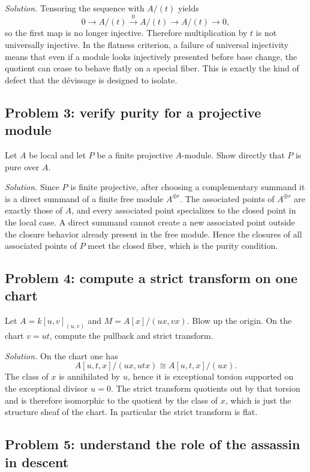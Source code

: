 \documentclass[11pt,oneside]{article}
\begin{document}
\emph{Solution.}  Tensoring the sequence with $A/(t)$ yields
\[
0\to A/(t)\xrightarrow{0}A/(t)\to A/(t)\to 0,
\]
so the first map is no longer injective.  Therefore multiplication by $t$ is not universally injective.  In the flatness criterion, a failure of universal injectivity means that even if a module looks injectively presented before base change, the quotient can cease to behave flatly on a special fiber.  This is exactly the kind of defect that the d\'evissage is designed to isolate.

\subsection*{Problem 3: verify purity for a projective module}

Let $A$ be local and let $P$ be a finite projective $A$-module.  Show directly that $P$ is pure over $A$.

\emph{Solution.}  Since $P$ is finite projective, after choosing a complementary summand it is a direct summand of a finite free module $A^{\oplus r}$.  The associated points of $A^{\oplus r}$ are exactly those of $A$, and every associated point specializes to the closed point in the local case.  A direct summand cannot create a new associated point outside the closure behavior already present in the free module.  Hence the closures of all associated points of $P$ meet the closed fiber, which is the purity condition.

\subsection*{Problem 4: compute a strict transform on one chart}

Let $A=k[u,v]_{(u,v)}$ and $M=A[x]/(ux,vx)$.  Blow up the origin.  On the chart $v=ut$, compute the pullback and strict transform.

\emph{Solution.}  On the chart one has
\[
A[u,t,x]/(ux,utx)\cong A[u,t,x]/(ux).
\]
The class of $x$ is annihilated by $u$, hence it is exceptional torsion supported on the exceptional divisor $u=0$.  The strict transform quotients out by that torsion and is therefore isomorphic to the quotient by the class of $x$, which is just the structure sheaf of the chart.  In particular the strict transform is flat.

\subsection*{Problem 5: understand the role of the assassin in descent}
\end{document}
